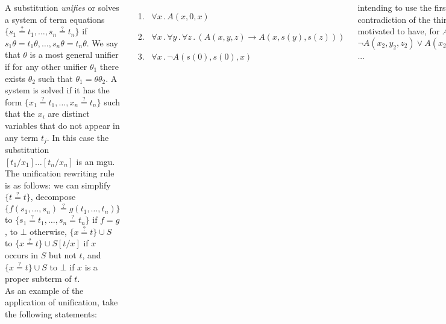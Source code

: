 \documentclass{tikzposter} %
\newtheorem{definition}{Definition}
\begin{document}
\begin{columns}
{      A substitution \emph{unifies} or solves a system of term equations $\{s_{1} \overset{?}{=} t_{1}, \dots, s_{n} \overset{?}{=} t_{n}\}$ if $s_{1} \theta = t_{1} \theta, \dots, s_{n} \theta = t_{n} \theta$. We say that $\theta$ is a most general unifier if for any other unifier $\theta_{1}$ there exists $\theta_{2}$ such that $\theta_{1} = \theta \theta_{2}$. A system is solved if it has the form $\{x_{1} \overset{?}{=} t_{1}, \dots, x_{n} \overset{?}{=} t_{n}\}$ such that the $x_{i}$ are distinct variables that do not appear in any term $t_{j}$. In this case the substitution $[t_{1} / x_{1}]\dots [t_{n} / x_{n}]$ is an mgu. \\

      The unification rewriting rule is as follows: we can simplify $\{t \overset{?}{=} t\}$, decompose $\{f(s_{1},\dots,s_{n}) \overset{?}{=} g(t_{1},\dots,t_{n})\}$ to $\{s_{1} \overset{?}{=} t_{1},\dots, s_{n} \overset{?}{=} t_{n}\}$ if $f = g$, to $\bot$ otherwise, $\{x \overset{?}{=} t\} \cup S$ to $\{x \overset{?}{=} t\} \cup S[t/x]$ if $x$ occurs in $S$ but not $t$, and $\{x \overset{?}{=} t\} \cup S$ to $\bot$ if $x$ is a proper subterm of $t$. \\

      As an example of the application of unification, take the following statements:
      \begin{enumerate}
        \item \ $\forall x \,.\, A(x,0,x)$
        \item \ $\forall x \,.\, \forall y \,.\, \forall z \,.\, (A(x,y,z) \rightarrow A(x,s(y),s(z)))$
        \item \ $\forall x \,.\, \neg A(s(0), s(0), x)$
      \end{enumerate}
      intending to use the first two to prove the contradiction of the third. We are then motivated to have, for $A(x_{1},0,x_{1})$, $\neg A(x_{2}, y_{2}, z_{2}) \lor A(x_{2}, s(y_{2}), s(z_{2}))$...
    }
\end{columns}
\end{document}
